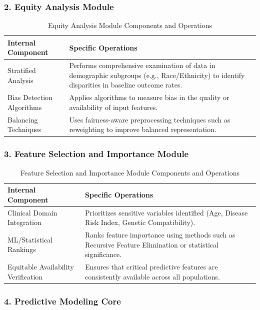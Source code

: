 \subsubsection{2. Equity Analysis Module}

\begin{table}[H]
\centering
\begin{tabular}{|p{5cm}|p{9cm}|}
\hline
\textbf{Internal Component} & \textbf{Specific Operations} \\
\hline
Stratified Analysis & Performs comprehensive examination of data in demographic subgroups (e.g., Race/Ethnicity) to identify disparities in baseline outcome rates. \\
\hline
Bias Detection Algorithms & Applies algorithms to measure bias in the quality or availability of input features. \\
\hline
Balancing Techniques & Uses fairness-aware preprocessing techniques such as reweighting to improve balanced representation. \\
\hline
\end{tabular}
\caption{Equity Analysis Module Components and Operations}
\label{tab:equity_module}
\end{table}

\subsubsection{3. Feature Selection and Importance Module}

\begin{table}[H]
\centering
\begin{tabular}{|p{5cm}|p{9cm}|}
\hline
\textbf{Internal Component} & \textbf{Specific Operations} \\
\hline
Clinical Domain Integration & Prioritizes sensitive variables identified (Age, Disease Risk Index, Genetic Compatibility). \\
\hline
ML/Statistical Rankings & Ranks feature importance using methods such as Recursive Feature Elimination or statistical significance. \\
\hline
Equitable Availability Verification & Ensures that critical predictive features are consistently available across all populations. \\
\hline
\end{tabular}
\caption{Feature Selection and Importance Module Components and Operations}
\label{tab:feature_module}
\end{table}

\subsubsection{4. Predictive Modeling Core}

